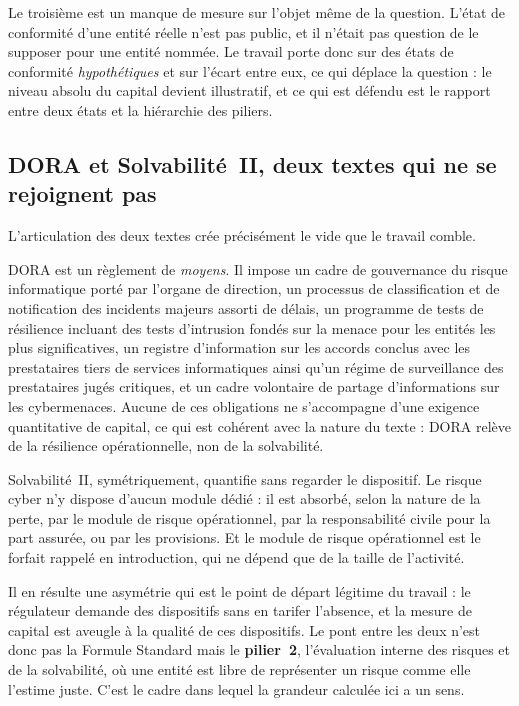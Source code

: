 \documentclass[12pt,a4paper]{article}
\theoremstyle{definition}
\begin{document}
Le troisième est un manque de mesure sur l'objet même de la question. L'état de
conformité d'une entité réelle n'est pas public, et il n'était pas question de le
supposer pour une entité nommée. Le travail porte donc sur des états de conformité
\emph{hypothétiques} et sur l'écart entre eux, ce qui déplace la question : le
niveau absolu du capital devient illustratif, et ce qui est défendu est le rapport
entre deux états et la hiérarchie des piliers.

\subsection{DORA et Solvabilité~II, deux textes qui ne se rejoignent pas}
\label{ss:dora}

L'articulation des deux textes crée précisément le vide que le travail comble.

DORA est un règlement de \emph{moyens}. Il impose un cadre de gouvernance du
risque informatique porté par l'organe de direction, un processus de
classification et de notification des incidents majeurs assorti de délais, un
programme de tests de résilience incluant des tests d'intrusion fondés sur la
menace pour les entités les plus significatives, un registre d'information sur les
accords conclus avec les prestataires tiers de services informatiques ainsi qu'un
régime de surveillance des prestataires jugés critiques, et un cadre volontaire de
partage d'informations sur les cybermenaces. Aucune de ces obligations ne
s'accompagne d'une exigence quantitative de capital, ce qui est cohérent avec la
nature du texte : DORA relève de la résilience opérationnelle, non de la
solvabilité.

Solvabilité~II, symétriquement, quantifie sans regarder le dispositif. Le risque
cyber n'y dispose d'aucun module dédié : il est absorbé, selon la nature de la
perte, par le module de risque opérationnel, par la responsabilité civile pour la
part assurée, ou par les provisions. Et le module de risque opérationnel est le
forfait rappelé en introduction, qui ne dépend que de la taille de l'activité.

Il en résulte une asymétrie qui est le point de départ légitime du travail : le
régulateur demande des dispositifs sans en tarifer l'absence, et la mesure de
capital est aveugle à la qualité de ces dispositifs. Le pont entre les deux n'est
donc pas la Formule Standard mais le \textbf{pilier~2}, l'évaluation interne des
risques et de la solvabilité, où une entité est libre de représenter un risque
comme elle l'estime juste. C'est le cadre dans lequel la grandeur calculée ici a
un sens.
\end{document}
